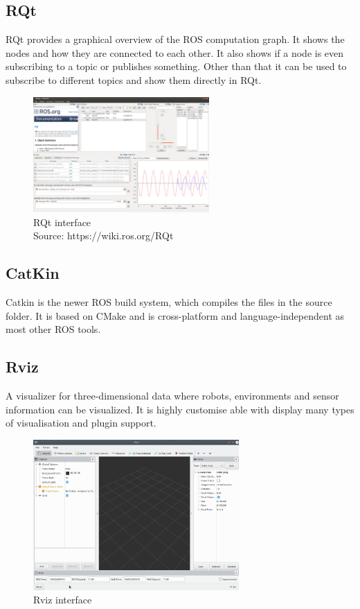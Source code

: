 \subsection{RQt}
RQt provides a graphical overview of the ROS computation graph. It shows the nodes and how they are connected to each other. It also shows if a node is even subscribing to a topic or publishes something. Other than that it can be used to subscribe to different topics and show them directly in RQt.
\begin{figure}[h]
	\centering
	\includegraphics[width=0.6\textwidth]{./media/images/RQt}
  	\caption{RQt interface\\Source: https://wiki.ros.org/RQt}
  	\label{rqtinterface}
\end{figure}

\subsection{CatKin}
Catkin is the newer ROS build system, which compiles the files in the source folder. It is based on CMake and is cross-platform and language-independent as most other ROS tools.

\subsection{Rviz}
A visualizer for three-dimensional data where robots, environments and sensor information can be visualized. It is highly customise able with display many types of visualisation and plugin support. \\
\begin{figure}[h]
	\centering
	\includegraphics[width=0.7\textwidth]{./media/images/rviz}
  	\caption{Rviz interface}
  	\label{rvizinterface}
\end{figure}

